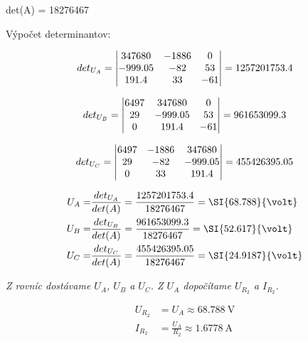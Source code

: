 \begin{center}
    det(A) = 18276467
\end{center}

Výpočet determinantov:

\begin{equation*}
\centering
{det}_{U_{A}}=
\begin{vmatrix}
347680&-1886&0 \\
-999.05&-82&53 \\
191.4&33&-61
\end{vmatrix}
=1257201753.4
\end{equation*}

\begin{equation*}
\centering
{det}_{U_{B}}=
\begin{vmatrix}
6497&347680&0 \\
29&-999.05&53 \\
0&191.4&-61
\end{vmatrix}
=961653099.3
\end{equation*}

\begin{equation*}
\centering
{det}_{U_{C}}=
\begin{vmatrix}
6497&-1886&347680 \\
29&-82&-999.05 \\
0&33&191.4
\end{vmatrix}
=455426395.05
\end{equation*}

\begin{equation*}
\begin{aligned}
\centering
U_A=&\frac{{det}_{U_{A}}}{det(A)}=\frac{1257201753.4}{18276467} = \SI{68.788}{\volt}\\
U_B=&\frac{{det}_{U_{B}}}{det(A)}=\frac{961653099.3}{18276467} = \SI{52.617}{\volt}\\
U_C=&\frac{{det}_{U_{C}}}{det(A)}=\frac{455426395.05}{18276467} = \SI{24.9187}{\volt}\\
\end{aligned}
\end{equation*}



\textit{Z rovníc dostávame $U_A$, $U_B$ a $U_C$. Z $U_A$ dopočítame $U_{{R}_2}$ a $I_{{R}_2}$.}

\begin{equation*}
\begin{aligned}
U_{{R}_2} &= U_A \approx \SI{68.788}{\volt} \\
I_{{R}_2} &= \frac{U_A}{R_2} \approx \SI{1.6778}{\ampere} \\
\end{aligned}
\end{equation*}

\clearpage